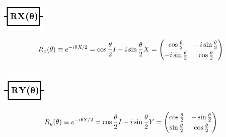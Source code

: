 \documentclass[10pt]{article}
\theoremstyle{definition}
\begin{document}
\begin{center}
\includegraphics[scale=.7]{Figures/Gates/RotXGateViewer} 
  \begin{minipage}{.9\linewidth}
    \begin{equation*} \label{mat:rotX}
    \renewcommand{\arraystretch}{1.25}
 R_x(\theta) \equiv e^{-i\theta X/2} = \cos\frac{\theta}{2} I - i \sin \frac{\theta}{2} X =  \begin{pmatrix} \cos \frac{\theta}{2} & -i\sin\frac{\theta}{2} \\ -i\sin\frac{\theta}{2} & \cos\frac{\theta}{2}\end{pmatrix}
    \end{equation*}
  \end{minipage}\hspace{-2.5cm}
  \begin{minipage}{.2\linewidth}
  \vspace*{3pt}
    \begin{align}
    \end{align}
  \end{minipage}
\end{center}

\begin{center}
\includegraphics[scale=.7]{Figures/Gates/RotYGateViewer}  
  \begin{minipage}{.9\linewidth}
    \begin{equation*} \label{mat:rotY}
    \renewcommand{\arraystretch}{1.25}
R_y(\theta) \equiv e^{-i\theta Y/2} = \cos\frac{\theta}{2} I - i \sin \frac{\theta}{2} Y =  \begin{pmatrix} \cos \frac{\theta}{2} & -\sin\frac{\theta}{2} \\ \sin\frac{\theta}{2} & \cos\frac{\theta}{2}\end{pmatrix}
    \end{equation*}
  \end{minipage}\hspace{-2.5cm}
  \begin{minipage}{.2\linewidth}
  \vspace*{3pt}
    \begin{align}
    \end{align}
  \end{minipage}
\end{center}
\end{document}
